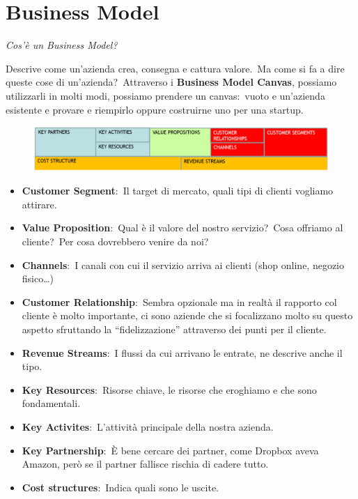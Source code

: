 \chapter{Business Model}

\begin{center}
    \textit{Cos'\`e un Business Model?}
\end{center}

\noindent Descrive come un'azienda crea, consegna e cattura valore.\
Ma come si fa a dire queste cose di un'azienda?\ Attraverso i \textbf{Business Model Canvas}, possiamo utilizzarli in molti modi, possiamo prendere un canvas:\ vuoto e un'azienda esistente e provare e riempirlo oppure costruirne uno per una startup.

\begin{figure}[H]
    \centering
    \includegraphics[width=\textwidth]{immagini/BusinessModelCanvas.png}
\end{figure}

\begin{itemize}
    \item \textbf{Customer Segment}:\ Il target di mercato, quali tipi di clienti vogliamo attirare.
    \item \textbf{Value Proposition}:\ Qual è il valore del nostro servizio?\ Cosa offriamo al cliente?\ Per cosa dovrebbero venire da noi?
    \item \textbf{Channels}:\ I canali con cui il servizio arriva ai clienti (shop online, negozio fisico\dots)
    \item \textbf{Customer Relationship}:\ Sembra opzionale ma in realtà il rapporto col cliente è molto importante, ci sono aziende che si focalizzano molto su questo aspetto sfruttando la “fidelizzazione” attraverso dei punti per il cliente.
    \item \textbf{Revenue Streams}:\ I flussi da cui arrivano le entrate, ne descrive anche il tipo.
    \item \textbf{Key Resources}:\ Risorse chiave, le risorse che eroghiamo e che sono fondamentali.
    \item \textbf{Key Activites}:\ L'attività principale della nostra azienda.
    \item \textbf{Key Partnership}:\ È bene cercare dei partner, come Dropbox aveva Amazon, però se il partner fallisce rischia di cadere tutto.
    \item \textbf{Cost structures}:\ Indica quali sono le uscite.
\end{itemize}

